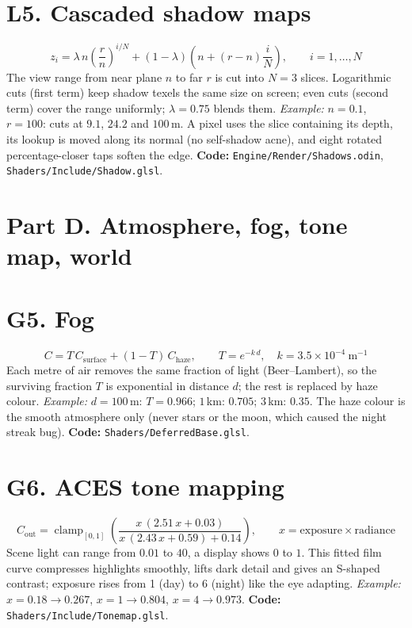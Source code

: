 \documentclass[11pt,a4paper]{article}
\newcommand{\code}[1]{{\small\texttt{#1}}}
\begin{document}
\section{L5. Cascaded shadow maps}
\[z_i=\lambda\,n\left(\frac{r}{n}\right)^{i/N}+(1-\lambda)\left(n+(r-n)\frac{i}{N}\right),\qquad i=1,\dots,N\]
The view range from near plane $n$ to far $r$ is cut into $N=3$ slices. Logarithmic cuts (first term) keep shadow texels the same size on screen; even cuts (second term) cover the range uniformly; $\lambda=0.75$ blends them. \emph{Example:} $n=0.1$, $r=100$: cuts at $9.1$, $24.2$ and $100$\,m. A pixel uses the slice containing its depth, its lookup is moved along its normal (no self-shadow acne), and eight rotated percentage-closer taps soften the edge. \textbf{Code:} \code{Engine/Render/Shadows.odin}, \code{Shaders/Include/Shadow.glsl}.

\section*{Part D. Atmosphere, fog, tone map, world}

\section{G5. Fog}
\[C=T\,C_{\text{surface}}+(1-T)\,C_{\text{haze}},\qquad T=e^{-k\,d},\quad k=3.5\times10^{-4}\ \text{m}^{-1}\]
Each metre of air removes the same fraction of light (Beer--Lambert), so the surviving fraction $T$ is exponential in distance $d$; the rest is replaced by haze colour. \emph{Example:} $d=100$\,m: $T=0.966$; $1$\,km: $0.705$; $3$\,km: $0.35$. The haze colour is the smooth atmosphere only (never stars or the moon, which caused the night streak bug). \textbf{Code:} \code{Shaders/DeferredBase.glsl}.

\section{G6. ACES tone mapping}
\[C_{\text{out}}=\operatorname{clamp}_{[0,1]}\!\left(\frac{x\,(2.51\,x+0.03)}{x\,(2.43\,x+0.59)+0.14}\right),\qquad x=\text{exposure}\times\text{radiance}\]
Scene light can range from $0.01$ to $40$, a display shows $0$ to $1$. This fitted film curve compresses highlights smoothly, lifts dark detail and gives an S-shaped contrast; exposure rises from 1 (day) to 6 (night) like the eye adapting. \emph{Example:} $x=0.18\to0.267$, $x=1\to0.804$, $x=4\to0.973$. \textbf{Code:} \code{Shaders/Include/Tonemap.glsl}.
\end{document}
